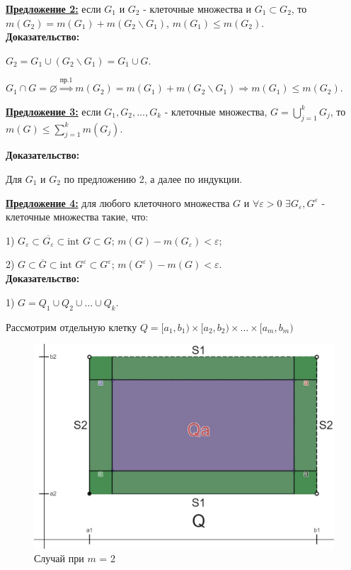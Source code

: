 \documentclass[a4paper,12pt]{article} %
\begin{document}
	\vspace{5mm}
	
	\underline{\textbf{Предложение 2:}} если $G_1$ и $G_2$ - клеточные множества и $G_1 \subset G_2$, то $m(G_2) = m(G_1) + m(G_2 \backslash G_1)$,  $m(G_1) \leqslant m(G_2)$.\\
	
	\textbf{Доказательство:}
	
	$G_2 = G_1 \cup (G_2 \backslash G_1) = G_1 \cup G$.
	
	$G_1 \cap G = \varnothing \stackrel{\text{пр.1}}{\Longrightarrow} m(G_2) = m(G_1) + m(G_2 \backslash G_1) \Rightarrow m(G_1) \leqslant m(G_2)$.
	
	\underline{\textbf{Предложение 3:}} если $G_1, G_2, \ldots, G_k$ - клеточные множества, $G = \bigcup\limits_{j = 1}^k G_j$, то $m(G) \leqslant \sum\limits_{j = 1}^k m(G_j)$.
	
	\textbf{Доказательство:}
	
	Для $G_1$ и $G_2$ по предложению 2, а далее по индукции.
	
	\vspace{3mm}
	
	\underline{\textbf{Предложение 4:}} для любого клеточного множества $G$ и $\forall \varepsilon > 0$ $\exists G_{\varepsilon}, G^{\varepsilon}$ - клеточные множества такие, что:
	
	1) $G_{\varepsilon} \subset \overline{G_{\varepsilon}} \subset \text{int } G \subset G$;\hspace{8mm} $m(G) - m(G_{\varepsilon}) < \varepsilon$;
	
	2) $G \subset \overline{G} \subset \text{int } G^{\varepsilon} \subset G^{\varepsilon}$; \hspace{7mm} $m(G^{\varepsilon}) - m(G) < \varepsilon$.\\
	
	\textbf{Доказательство:}
	
	1) $G = Q_1 \cup Q_2 \cup \ldots \cup Q_k$.
	
	Рассмотрим отдельную клетку $Q = [a_1, b_1) \times [a_2, b_2) \times \ldots \times [a_m, b_m)$
	
	\begin{figure}[h!]
		\centering
		\includegraphics[scale=0.3]{Пред4.jpg}
		\caption{Случай при $m$ = 2}
	\end{figure}
	
\end{document}
